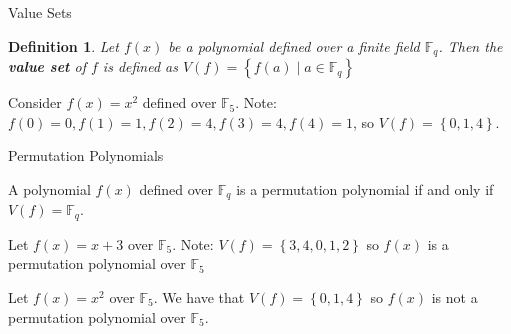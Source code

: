 \documentclass{beamer}
\newtheorem*{definition*}{Definition}
\begin{document}
\begin{frame}{Value Sets}

\begin{definition*}
  Let $f(x)$ be a polynomial defined over a finite field $\mathbb{F}_{q}$. Then the \textbf{value set} of $f$ is defined as $V(f) = \left\{f(a) \mid a \in \mathbb{F}_{q} \right\}$
\end{definition*}

\begin{example}
  Consider $f(x) = x^2$ defined over $\mathbb{F}_{5}$. Note: $f(0) = 0, f(1) = 1, f(2) = 4, f(3) = 4, f(4) = 1$, so $V(f) = \left\{0, 1, 4 \right\}$.
\end{example}

\end{frame}

\begin{frame}{Permutation Polynomials}

\begin{definition}
  A polynomial $f(x)$ defined over $\mathbb{F}_{q}$ is a permutation polynomial if and only if  $V(f) = \mathbb{F}_{q}$.
\end{definition}

\pause

\begin{example}
  Let $f(x) = x+3$ over $\mathbb{F}_{5}$. Note: $V(f) = \left\{3, 4, 0, 1, 2 \right\}$ so $f(x)$ is a permutation polynomial over $\mathbb{F}_{5}$
\end{example}

\pause

\begin{example}
Let $f(x) = x^2$ over $\mathbb{F}_{5}$. We have that $V(f) = \left\{0, 1, 4 \right\}$ so $f(x)$ is not a permutation polynomial over $\mathbb{F}_{5}$.
\end{example}

\end{frame}
\end{document}
